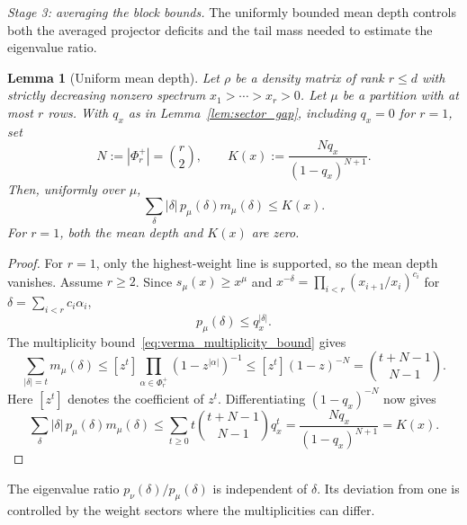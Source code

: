 \documentclass[a4paper,onecolumn,11pt]{quantumarticle}
\newtheorem{lem}{Lemma}
\begin{document}
\emph{Stage 3: averaging the block bounds.}
The uniformly bounded mean depth controls both the averaged
projector deficits and the tail mass needed to estimate the
eigenvalue ratio.

\begin{lem}[Uniform mean depth]\label{lem:tail}
Let \(\rho\) be a density matrix of rank \(r\le d\) with strictly decreasing nonzero spectrum \(x_1>\cdots>x_r>0\).
Let $\mu$ be a partition with at most $r$ rows. With $q_x$ as in
Lemma~\ref{lem:sector_gap}, including $q_x=0$ for $r=1$, set
\[
N:=|\Phi_r^+|=\binom r2,\qquad
K(x):=\frac{Nq_x}{(1-q_x)^{N+1}}.
\]
Then, uniformly over $\mu$,
\begin{equation}\label{eq:uniform_mean_depth}
\sum_{\delta}|\delta|\,p_\mu(\delta)m_\mu(\delta)
\le K(x).
\end{equation}
For $r=1$, both the mean depth and $K(x)$ are zero.
\end{lem}
\begin{proof}
For $r=1$, only the highest-weight line is supported, so the mean
depth vanishes. Assume $r\ge2$. Since
$s_\mu(x)\ge x^\mu$ and
$x^{-\delta}=\prod_{i<r}(x_{i+1}/x_i)^{c_i}$ for
$\delta=\sum_{i<r}c_i\alpha_i$,
\[
p_\mu(\delta)\le q_x^{|\delta|}.
\]
The multiplicity bound~\eqref{eq:verma_multiplicity_bound} gives
\[
\sum_{|\delta|=t}m_\mu(\delta)
\le[z^t]\prod_{\alpha\in\Phi_r^+}(1-z^{|\alpha|})^{-1}
\le[z^t](1-z)^{-N}
=\binom{t+N-1}{N-1}.
\]
Here $[z^t]$ denotes the coefficient of $z^t$.
Differentiating $(1-q_x)^{-N}$ now gives
\[
\sum_\delta|\delta|\,p_\mu(\delta)m_\mu(\delta)
\le\sum_{t\ge0}t\binom{t+N-1}{N-1}q_x^t
=\frac{Nq_x}{(1-q_x)^{N+1}}=K(x).
\]
\end{proof}

The eigenvalue ratio $p_\nu(\delta)/p_\mu(\delta)$ is independent
of $\delta$. Its deviation from one is controlled by the weight
sectors where the multiplicities can differ.
\end{document}
